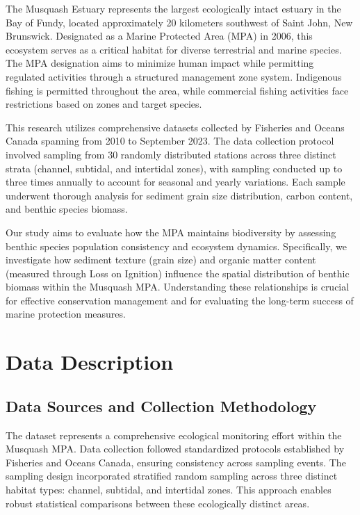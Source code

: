 \documentclass[12pt]{article}
\begin{document}
\qquad The Musquash Estuary represents the largest ecologically intact estuary in the Bay of Fundy, located approximately 20 kilometers southwest of Saint John, New Brunswick. Designated as a Marine Protected Area (MPA) in 2006, this ecosystem serves as a critical habitat for diverse terrestrial and marine species. The MPA designation aims to minimize human impact while permitting regulated activities through a structured management zone system. Indigenous fishing is permitted throughout the area, while commercial fishing activities face restrictions based on zones and target species\cite{DFO2017}.

\qquad This research utilizes comprehensive datasets collected by Fisheries and Oceans Canada spanning from 2010 to September 2023. The data collection protocol involved sampling from 30 randomly distributed stations across three distinct strata (channel, subtidal, and intertidal zones), with sampling conducted up to three times annually to account for seasonal and yearly variations. Each sample underwent thorough analysis for sediment grain size distribution, carbon content, and benthic species biomass.

\qquad Our study aims to evaluate how the MPA maintains biodiversity by assessing benthic species population consistency and ecosystem dynamics. Specifically, we investigate how sediment texture (grain size) and organic matter content (measured through Loss on Ignition) influence the spatial distribution of benthic biomass within the Musquash MPA. Understanding these relationships is crucial for effective conservation management and for evaluating the long-term success of marine protection measures.

\newpage

\section{Data Description}

\subsection{Data Sources and Collection Methodology}

\qquad The dataset represents a comprehensive ecological monitoring effort within the Musquash MPA. Data collection followed standardized protocols established by Fisheries and Oceans Canada, ensuring consistency across sampling events. The sampling design incorporated stratified random sampling across three distinct habitat types: channel, subtidal, and intertidal zones. This approach enables robust statistical comparisons between these ecologically distinct areas.
\end{document}
